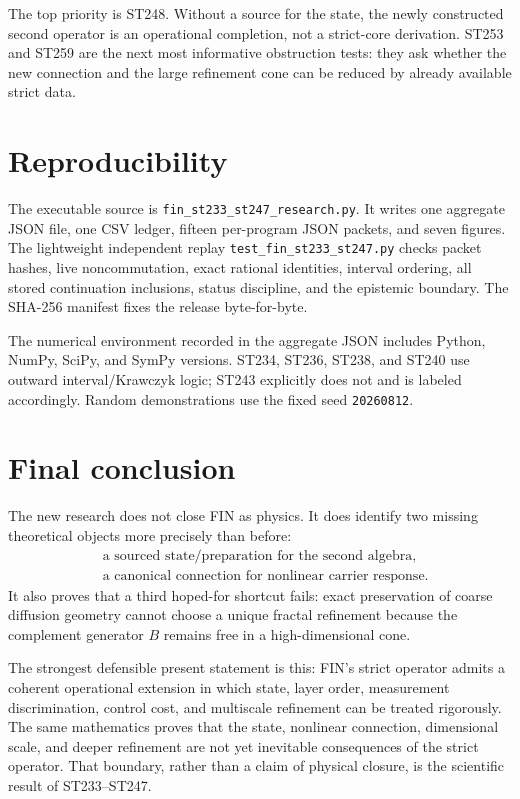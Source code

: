 \documentclass[11pt,a4paper]{article}
\begin{document}
The top priority is ST248. Without a source for the state, the newly constructed second
operator is an operational completion, not a strict-core derivation. ST253 and ST259 are
the next most informative obstruction tests: they ask whether the new connection and the
large refinement cone can be reduced by already available strict data.

\section{Reproducibility}

The executable source is \texttt{fin\_st233\_st247\_research.py}. It writes one aggregate
JSON file, one CSV ledger, fifteen per-program JSON packets, and seven figures. The
lightweight independent replay \texttt{test\_fin\_st233\_st247.py} checks packet hashes,
live noncommutation, exact rational identities, interval ordering, all stored continuation
inclusions, status discipline, and the epistemic boundary. The SHA-256 manifest fixes the
release byte-for-byte.

The numerical environment recorded in the aggregate JSON includes Python, NumPy, SciPy,
and SymPy versions. ST234, ST236, ST238, and ST240 use outward interval/Krawczyk logic;
ST243 explicitly does not and is labeled accordingly. Random demonstrations use the fixed
seed \texttt{20260812}.

\section{Final conclusion}

The new research does not close FIN as physics. It does identify two missing theoretical
objects more precisely than before:
\begin{align*}
&\boxed{\text{a sourced state/preparation for the second algebra}},\\
&\boxed{\text{a canonical connection for nonlinear carrier response}}.
\end{align*}
It also proves that a third hoped-for shortcut fails: exact preservation of coarse
diffusion geometry cannot choose a unique fractal refinement because the complement
generator $B$ remains free in a high-dimensional cone.

The strongest defensible present statement is this: FIN's strict operator admits a coherent
operational extension in which state, layer order, measurement discrimination, control
cost, and multiscale refinement can be treated rigorously. The same mathematics proves
that the state, nonlinear connection, dimensional scale, and deeper refinement are not yet
inevitable consequences of the strict operator. That boundary, rather than a claim of
physical closure, is the scientific result of ST233--ST247.
\end{document}
